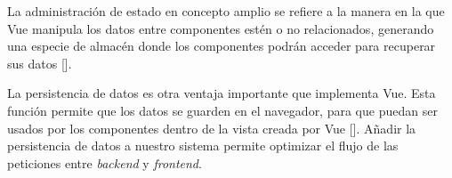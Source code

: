 La administración de estado en concepto amplio se refiere a la manera en la que Vue manipula los datos entre componentes estén o no relacionados, generando una especie de almacén donde los componentes podrán acceder para recuperar sus datos [\cite{52}]. 

La persistencia de datos es otra ventaja importante que implementa Vue. Esta función permite que los datos se guarden en el navegador, para que puedan ser usados por los componentes dentro de la vista creada por Vue [\cite{50}]. Añadir la persistencia de datos a nuestro sistema permite optimizar el flujo de las peticiones entre \textit{backend} y \textit{frontend}.





